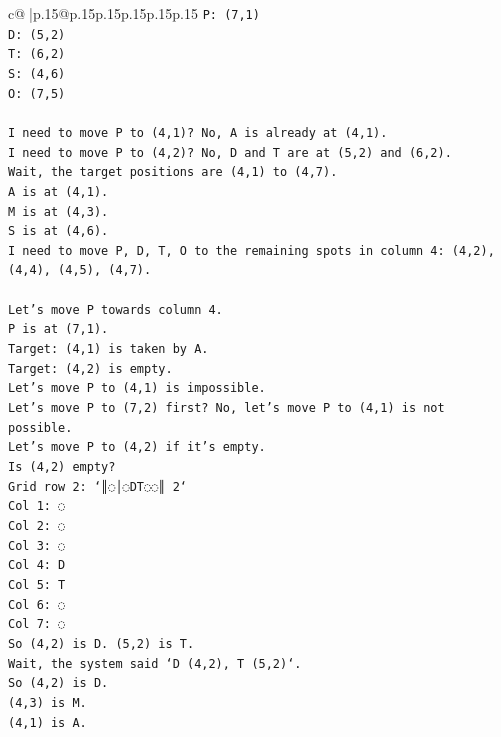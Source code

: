 \documentclass{article}
\begin{document}
{\begin{supertabular}{c@{$\;$}|p{.15\linewidth}@{}p{.15\linewidth}p{.15\linewidth}p{.15\linewidth}p{.15\linewidth}p{.15\linewidth}}
{{{\texttt{P: (7,1)} \\
\texttt{D: (5,2)} \\
\texttt{T: (6,2)} \\
\texttt{S: (4,6)} \\
\texttt{O: (7,5)} \\
\\ 
\texttt{I need to move P to (4,1)? No, A is already at (4,1).} \\
\texttt{I need to move P to (4,2)? No, D and T are at (5,2) and (6,2).} \\
\texttt{Wait, the target positions are (4,1) to (4,7).} \\
\texttt{A is at (4,1).} \\
\texttt{M is at (4,3).} \\
\texttt{S is at (4,6).} \\
\texttt{I need to move P, D, T, O to the remaining spots in column 4: (4,2), (4,4), (4,5), (4,7).} \\
\\ 
\texttt{Let's move P towards column 4.} \\
\texttt{P is at (7,1).} \\
\texttt{Target: (4,1) is taken by A.} \\
\texttt{Target: (4,2) is empty.} \\
\texttt{Let's move P to (4,1) is impossible.} \\
\texttt{Let's move P to (7,2) first? No, let's move P to (4,1) is not possible.} \\
\texttt{Let's move P to (4,2) if it's empty.} \\
\texttt{Is (4,2) empty?} \\
\texttt{Grid row 2: `║◌│◌DT◌◌║ 2`} \\
\texttt{Col 1: ◌} \\
\texttt{Col 2: ◌} \\
\texttt{Col 3: ◌} \\
\texttt{Col 4: D} \\
\texttt{Col 5: T} \\
\texttt{Col 6: ◌} \\
\texttt{Col 7: ◌} \\
\texttt{So (4,2) is D. (5,2) is T.} \\
\texttt{Wait, the system said `D (4,2), T (5,2)`.} \\
\texttt{So (4,2) is D.} \\
\texttt{(4,3) is M.} \\
\texttt{(4,1) is A.} \\
}}}
\end{supertabular}}
\end{document}
